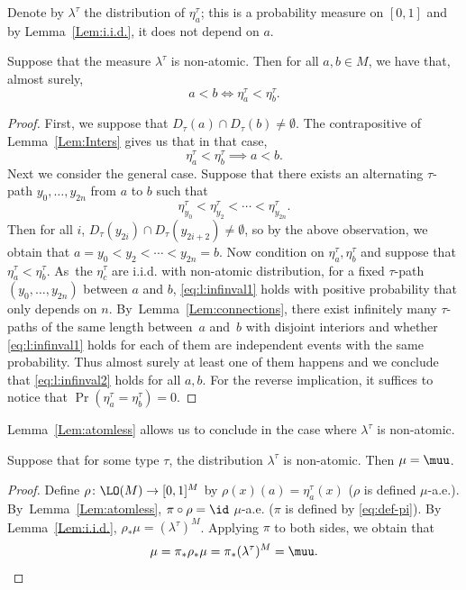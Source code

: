 Denote by $\lambda^\tau$ the distribution of $\eta^\tau_a$; this is a probability measure on $[0, 1]$ and by Lemma~\ref{Lem:i.i.d.}, it does not depend on $a$.
\begin{lemma}
\label{Lem:atomless}
Suppose that the measure $\lambda^\tau$ is non-atomic. Then for all $a, b \in M$, we have that, almost surely,
\begin{equation*}
a < b \iff \eta^\tau_a < \eta^\tau_b.
\end{equation*}
\end{lemma}
\begin{proof}
First, we suppose that $D_\tau (a) \cap D_\tau (b) \neq \emptyset$. The contrapositive of Lemma~\ref{Lem:Inters} gives us that in that case,
\begin{equation}
\label{eq:l:infinval2}
\eta_a^\tau < \eta_b^\tau \implies a < b.
\end{equation}
Next we consider the general case. Suppose that there exists an alternating $\tau$-path $y_0, \ldots, y_{2n}$ from $a$ to $b$ such that
\begin{equation}
\label{eq:l:infinval1}
\eta^\tau_{y_0} < \eta^\tau_{y_2} < \cdots < \eta^\tau_{y_{2n}}.
\end{equation}
Then for all $i$, $D_\tau(y_{2i}) \cap D_\tau(y_{2i+2}) \neq \emptyset$, so by the above observation, we obtain that $a = y_0 < y_2 < \cdots < y_{2n} = b$. Now condition on $\eta^\tau_a, \eta^\tau_b$ and suppose that $\eta^\tau_a < \eta^\tau_b$. As~the $\eta^\tau_c$ are i.i.d. with non-atomic distribution, for a fixed $\tau$-path $(y_0, \ldots, y_{2n})$ between $a$ and $b$, \eqref{eq:l:infinval1} holds with positive probability that only depends on $n$. By~Lemma~\ref{Lem:connections}, there exist infinitely many $\tau$-paths of the same length between~$a$ and~$b$ with disjoint interiors and whether \eqref{eq:l:infinval1} holds for each of them are independent events with the same probability. Thus almost surely at least one of them happens and we conclude that \eqref{eq:l:infinval2} holds for all $a, b$. For the reverse implication, it suffices to notice that $\Pr(\eta^\tau_a = \eta^\tau_b) = 0$.
\end{proof}

Lemma~\ref{Lem:atomless} allows us to conclude in the case where $\lambda^\tau$ is non-atomic.
\begin{lemma}
\label{l:non-atomic}
Suppose that for some type $\tau$, the distribution $\lambda^\tau$ is non-atomic. Then $\mu = \muu$.
\end{lemma}
\begin{proof}
Define $\rho \colon \LO(M) \to [0, 1]^M$ by $\rho(x)(a) = \eta^\tau_a(x)$ ($\rho$ is defined $\mu$-a.e.). By~Lemma~\ref{Lem:atomless}, $\pi \circ \rho = \id$ $\mu$-a.e. ($\pi$ is defined by \eqref{eq:def-pi}). By Lemma~\ref{Lem:i.i.d.}, $\rho_* \mu = (\lambda^\tau)^M$. Applying $\pi$ to both sides, we obtain that
\begin{equation*}
\mu = \pi_* \rho_* \mu = \pi_*(\lambda^\tau)^M = \muu. \qedhere
\end{equation*}
\end{proof}

